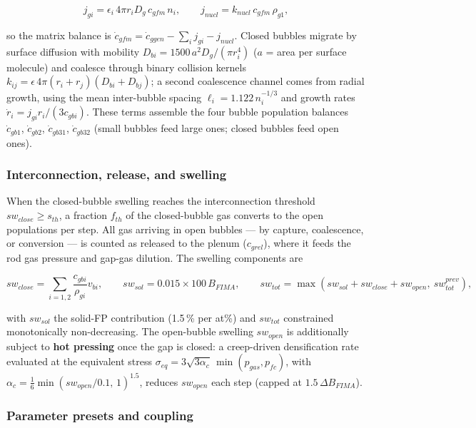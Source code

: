 \begin{refsection}
\begin{equation}
  j_{gi} = \epsilon_i\, 4\pi r_i D_g\, c_{gfm}\, n_i, \qquad
  j_{nucl} = k_{nucl}\, c_{gfm}\, \rho_{g1},
  \label{eq:grsis_capture}
\end{equation}

so the matrix balance is $\dot c_{gfm} = \dot c_{ggen} - \sum_i j_{gi} -
j_{nucl}$.  Closed bubbles migrate by surface diffusion with mobility
$D_{bi} = 1500\,a^2 D_g / (\pi r_i^4)$ ($a$ = area per surface molecule)
and coalesce through binary collision kernels
$k_{ij} = \epsilon\,4\pi(r_i{+}r_j)(D_{bi}{+}D_{bj})$; a second coalescence
channel comes from radial growth, using the mean inter-bubble spacing
$\ell_i = 1.122\,n_i^{-1/3}$ and growth rates
$\dot r_i = j_{gi} r_i/(3 c_{gbi})$.  These terms assemble the four bubble
population balances $\dot c_{gb1}$, $\dot c_{gb2}$, $\dot c_{gb31}$,
$\dot c_{gb32}$ (small bubbles feed large ones; closed bubbles feed open
ones).

\subsubsection{Interconnection, release, and swelling}

When the closed-bubble swelling reaches the interconnection threshold
$sw_{close} \geq s_{th}$, a fraction $f_{th}$ of the closed-bubble gas
converts to the open populations per step.  All gas arriving in open
bubbles — by capture, coalescence, or conversion — is counted as released
to the plenum ($c_{grel}$), where it feeds the rod gas pressure and gap-gas
dilution.  The swelling components are

\begin{equation}
  sw_{close} = \sum_{i=1,2} \frac{c_{gbi}}{\rho_{gi}} v_{bi}, \qquad
  sw_{sol} = 0.015 \times 100\,B_{FIMA}, \qquad
  sw_{tot} = \max(sw_{sol} + sw_{close} + sw_{open},\ sw_{tot}^{prev}),
  \label{eq:grsis_swelling}
\end{equation}

with $sw_{sol}$ the solid-FP contribution (1.5\,\% per at\%) and $sw_{tot}$
constrained monotonically non-decreasing.  The open-bubble swelling
$sw_{open}$ is additionally subject to \textbf{hot pressing} once the gap is
closed: a creep-driven densification rate evaluated at the equivalent
stress $\sigma_{eq} = 3\sqrt{3\alpha_c}\,\min(p_{gas}, p_{fc})$, with
$\alpha_c = \tfrac16 \min(sw_{open}/0.1,\,1)^{1.5}$, reduces $sw_{open}$
each step (capped at $1.5\,\Delta B_{FIMA}$).

\subsubsection{Parameter presets and coupling}


\end{refsection}
